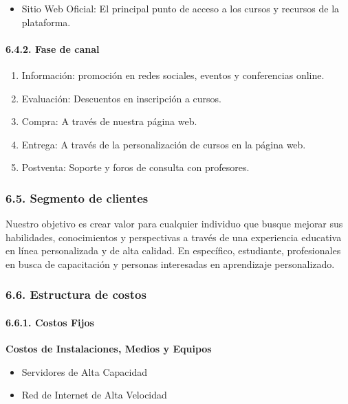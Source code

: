\documentclass[
]{article}
\providecommand{\tightlist}{%
  \setlength{\itemsep}{0pt}\setlength{\parskip}{0pt}}
\begin{document}
\begin{itemize}
\tightlist
\item
  Sitio Web Oficial: El principal punto de acceso a los cursos y
  recursos de la plataforma.
\end{itemize}

\paragraph{6.4.2. Fase de canal}\label{fase-de-canal}

\begin{enumerate}
\def\labelenumi{\arabic{enumi}.}
\tightlist
\item
  Información: promoción en redes sociales, eventos y conferencias
  online.
\item
  Evaluación: Descuentos en inscripción a cursos.
\item
  Compra: A través de nuestra página web.
\item
  Entrega: A través de la personalización de cursos en la página web.
\item
  Postventa: Soporte y foros de consulta con profesores.
\end{enumerate}

\subsubsection{6.5. Segmento de clientes}\label{segmento-de-clientes}

Nuestro objetivo es crear valor para cualquier individuo que busque
mejorar sus habilidades, conocimientos y perspectivas a través de una
experiencia educativa en línea personalizada y de alta calidad. En
específico, estudiante, profesionales en busca de capacitación y
personas interesadas en aprendizaje personalizado.

\subsubsection{6.6. Estructura de costos}\label{estructura-de-costos}

\paragraph{6.6.1. Costos Fijos}\label{costos-fijos}

\textbf{Costos de Instalaciones, Medios y Equipos}

\begin{itemize}
\tightlist
\item
  Servidores de Alta Capacidad
\item
  Red de Internet de Alta Velocidad
\end{itemize}
\end{document}
